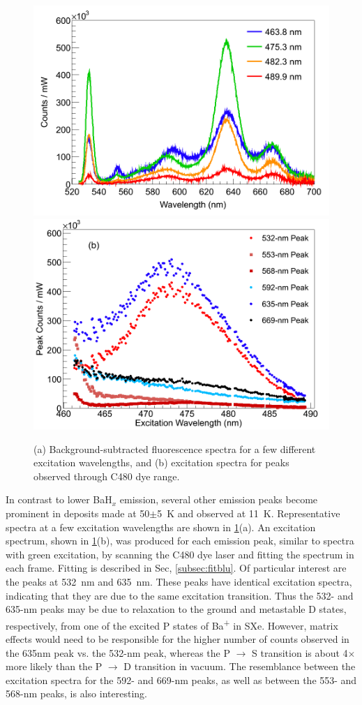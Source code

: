\begin{figure} %
        \centering
                \includegraphics[width=.7\textwidth]{figures/excitspec_blu_a.png}
                \includegraphics[width=.7\textwidth]{figures/excitspecBlue_b.png}
                \caption{(a) Background-subtracted fluorescence spectra for a few different excitation wavelengths, and (b) excitation spectra for peaks observed through C480 dye range.}
\label{fig:excitspecBlue}
\end{figure}

In contrast to lower BaH$_{x}$ emission, several other emission peaks become prominent in deposits made at 50$\pm$5~K and observed at 11~K.  Representative spectra at a few excitation wavelengths are shown in \ref{fig:excitspecBlue}(a).  An excitation spectrum, shown in \ref{fig:excitspecBlue}(b), was produced for each emission peak, similar to spectra with green excitation, by scanning the C480 dye laser and fitting the spectrum in each frame.  Fitting is described in Sec, \ref{subsec:fitblu}.  Of particular interest are the peaks at 532~nm and 635~nm.  These peaks have identical excitation spectra, indicating that they are due to the same excitation transition.  Thus the 532- and 635-nm peaks may be due to relaxation to the ground and metastable D states, respectively, from one of the excited P states of Ba\textsuperscript{+} in SXe.  However, matrix effects would need to be responsible for the higher number of counts observed in the 635nm peak vs. the 532-nm peak, whereas the P $\rightarrow$ S transition is about 4$\times$ more likely than the P $\rightarrow$ D transition in vacuum.  The resemblance between the excitation spectra for the 592- and 669-nm peaks, as well as between the 553- and 568-nm peaks, is also interesting.  


